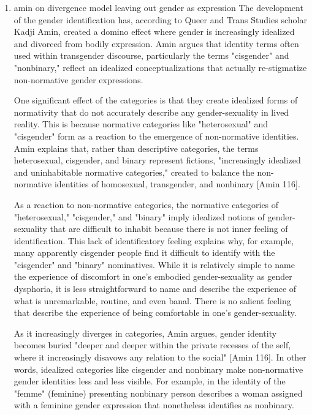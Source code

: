 \documentclass[11pt]{article}
\begin{document}
\begin{enumerate}
\item amin on divergence model leaving out gender as expression
\label{sec:orgb1567f1}
The development of the gender identification has, according to Queer
and Trans Studies scholar Kadji Amin, created a domino effect where
gender is increasingly idealized and divorced from bodily expression.
Amin argues that identity terms often used within transgender
discourse, particularly the terms "cisgender" and "nonbinary," reflect
an idealized conceptualizations that actually re-stigmatize
non-normative gender expressions.

One significant effect of the categories is that they create idealized
forms of normativity that do not accurately describe any
gender-sexuality in lived reality. This is because normative
categories like "heterosexual" and "cisgender" form as a reaction to
the emergence of non-normative identities. Amin explains that, rather
than descriptive categories, the terms heterosexual, cisgender, and
binary represent fictions, "increasingly idealized and uninhabitable
normative categories," created to balance the non-normative identities
of homosexual, transgender, and nonbinary [Amin 116].

As a reaction to non-normative categories, the normative categories of
"heterosexual," "cisgender," and "binary" imply idealized notions of
gender-sexuality that are difficult to inhabit because there is not
inner feeling of identification. This lack of identificatory feeling
explains why, for example, many apparently cisgender people find it
difficult to identify with the "cisgender" and "binary" nominatives.
While it is relatively simple to name the experience of discomfort in
one's embodied gender-sexuality as gender dysphoria, it is less
straightforward to name and describe the experience of what is
unremarkable, routine, and even banal. There is no salient feeling
that describe the experience of being comfortable in one's
gender-sexuality.

As it increasingly diverges in categories, Amin argues, gender
identity becomes buried "deeper and deeper within the private recesses
of the self, where it increasingly disavows any relation to the
social" [Amin 116]. In other words, idealized categories like
cisgender and nonbinary make non-normative gender identities less and
less visible. For example, in the identity of the "femme" (feminine)
presenting nonbinary person describes a woman assigned with a feminine
gender expression that nonetheless identifies as nonbinary.


\end{enumerate}
\end{document}
